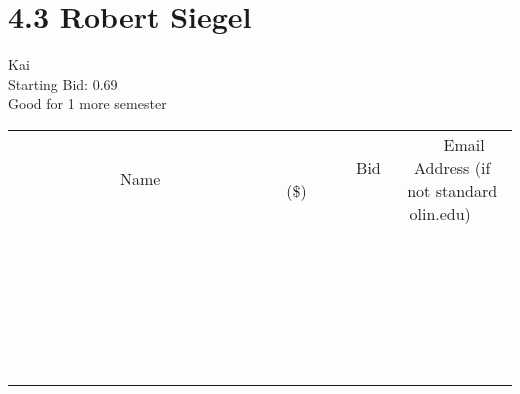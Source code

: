 \documentclass[11pt]{article}
\begin{document}
					\section*{4.3 Robert Siegel}
					Kai \\
					Starting Bid: 0.69 \\
					Good for 1 more semester \\
					[6ex]
					\begin{tabular}{c c c}
						~~~~~~~~~~~~~Name~~~~~~~~~~~~~ & ~~~~~~~~~Bid (\$)~~~~~~~~~ & ~~~Email Address (if not standard olin.edu)~~~ \\
				
 & & \\
\hline
 & & \\
\hline
 & & \\
\hline
 & & \\
\hline
 & & \\
\hline
 & & \\
\hline
 & & \\
\hline
 & & \\
\hline
 & & \\
\hline
 & & \\
\hline
 & & \\
\hline
 & & \\
\hline
 & & \\
\hline
 & & \\
\hline
 & & \\
\hline
 & & \\
\hline
 & & \\
\hline
 & & \\
\hline
 & & \\
\hline
 & & \\
\hline
 & & \\
\hline
 & & \\
\hline
 & & \\
\hline
 & & \\
\hline
 & & \\
\hline
 & & \\
\hline
					\end{tabular}
					\clearpage
				
\end{document}
